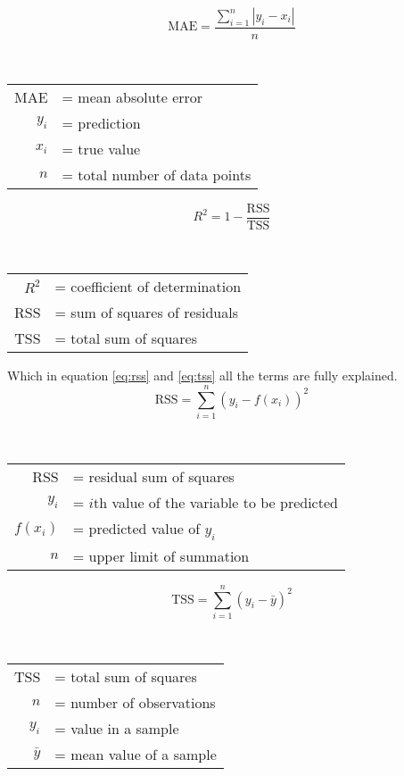 \documentclass{article}
\begin{document}
\begin{itemize}
\begin{equation}
    \text{MAE} = \frac{\sum_{i=1}^n |y_i - x_i|}{n}
    \label{eq:mae}
\end{equation}
\begin{flushleft}
\\[0.5em]
\begin{tabular}{@{}r@{\ }l@{}}
    MAE & = mean absolute error \\
    $y_i$ & = prediction \\
    $x_i$ & = true value \\
    $n$ & = total number of data points
\end{tabular}
\end{flushleft}

\begin{equation}
    R^2 = 1 - \frac{\text{RSS}}{\text{TSS}}
    \label{eq:r_squared}
\end{equation}
\begin{flushleft}
\\[0.5em]
\begin{tabular}{@{}r@{\ }l@{}}
    $R^2$ & = coefficient of determination \\
    RSS & = sum of squares of residuals \\
    TSS & = total sum of squares
\end{tabular}
\end{flushleft}

Which in equation \ref{eq:rss} and \ref{eq:tss} all the terms are fully explained.
\begin{equation}
    \text{RSS} = \sum_{i=1}^n (y_i - f(x_i))^2
    \label{eq:rss}
\end{equation}
\begin{flushleft}
\\[0.5em]
\begin{tabular}{@{}r@{\ }l@{}}
    RSS & = residual sum of squares \\
    $y_i$ & = $i$th value of the variable to be predicted \\
    $f(x_i)$ & = predicted value of $y_i$ \\
    $n$ & = upper limit of summation
\end{tabular}
\end{flushleft}

\begin{equation}
    \text{TSS} = \sum_{i=1}^n (y_i - \bar{y})^2
    \label{eq:tss}
\end{equation}
\begin{flushleft}
\\[0.5em]
\begin{tabular}{@{}r@{\ }l@{}}
    TSS & = total sum of squares \\
    $n$ & = number of observations \\
    $y_i$ & = value in a sample \\
    $\bar{y}$ & = mean value of a sample
\end{tabular}
\end{flushleft}


\end{itemize}
\end{document}
